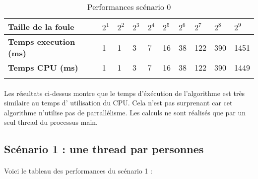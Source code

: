\documentclass[12pt,oneside,a4paper]{article}
\begin{document}
\begin{table}[h]
  \centering
  \small
  \begin{tabular}{llllllllll}
    \hline
    \multicolumn{1}{|l|}{\textbf{Taille de la foule}}                     & \multicolumn{1}{l|}{$2^1$} & \multicolumn{1}{l|}{$2^2$} & \multicolumn{1}{l|}{$2^3$} & \multicolumn{1}{l|}{$2^4$} & \multicolumn{1}{l|}{$2^5$} & \multicolumn{1}{l|}{$2^6$} & \multicolumn{1}{l|}{$2^7$} & \multicolumn{1}{l|}{$2^8$} & \multicolumn{1}{l|}{$2^9$} \\ \hline
    \multicolumn{1}{|l|}{\textbf{Temps execution (ms)}} & \multicolumn{1}{l|}{1}  & \multicolumn{1}{l|}{1}  & \multicolumn{1}{l|}{3}  & \multicolumn{1}{l|}{7}  & \multicolumn{1}{l|}{16}  & \multicolumn{1}{l|}{38}  & \multicolumn{1}{l|}{122}  & \multicolumn{1}{l|}{390}  & \multicolumn{1}{l|}{1451}  \\ \hline
    \multicolumn{1}{|l|}{\textbf{Temps CPU (ms)}}    & \multicolumn{1}{l|}{1}  & \multicolumn{1}{l|}{1}  & \multicolumn{1}{l|}{3}  & \multicolumn{1}{l|}{7}  & \multicolumn{1}{l|}{16}  & \multicolumn{1}{l|}{38}  & \multicolumn{1}{l|}{122}  & \multicolumn{1}{l|}{390}  & \multicolumn{1}{l|}{1449}  \\ \hline
                                                                          &                        &                        &                        &                        &                        &                        &                        &                        &                       
    \end{tabular}
  \caption{Performances scénario 0}
  \label{Performances scénario 0}
\end{table}

\paragraph{}
Les résultats ci-dessus montre que le temps d'éxécution de l'algorithme est très similaire au temps d'
utilisation du CPU. Cela n'est pas surprenant car cet algorithme n'utilise pas de parrallélisme. Les 
calculs ne sont réalisés que par un seul thread du processus main.

\subsection{Scénario 1 : une thread par personnes}
\paragraph{}
Voici le tableau des performances du scénario 1 :
\end{document}
